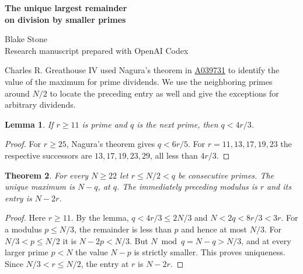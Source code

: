 \documentclass[11pt,letterpaper]{article}
\newtheorem{theorem}{Theorem}
\newtheorem{lemma}[theorem]{Lemma}
\newcommand{\oeis}[1]{\href{https://oeis.org/A#1}{A#1}}
\begin{document}
\thispagestyle{plain}
\begin{center}
{\LARGE\bfseries The unique largest remainder\\[0.12em] on division by smaller primes\par}
\vspace{0.5em}
Blake Stone\\
{\small Research manuscript prepared with OpenAI Codex}
\end{center}

\begin{abstract}
For an integer $N\ge3$, list $N\bmod p$ over the primes $p<N$ in increasing order. The largest entry is always unique. Its modulus is the first prime above $N/2$, with the single exception $N=14$. For $N\ge4$ the entry preceding the maximum has the parity of $N$, except at $N=9,21$. Restricting to prime $N$ proves Mike Jones's conjecture on OEIS \oeis{207409}.
\end{abstract}

Charles R. Greathouse IV used Nagura's theorem in \oeis{039731} to identify the value of the maximum for prime dividends. We use the neighboring primes around $N/2$ to locate the preceding entry as well and give the exceptions for arbitrary dividends.

\begin{lemma}
If $r\ge11$ is prime and $q$ is the next prime, then $q<4r/3$.
\end{lemma}
\begin{proof}
For $r\ge25$, Nagura's theorem \cite{nagura} gives $q<6r/5$. For $r=11,13,17,19,23$ the respective successors are $13,17,19,23,29$, all less than $4r/3$.
\end{proof}

\begin{theorem}
For every $N\ge22$ let $r\le N/2<q$ be consecutive primes. The unique maximum is $N-q$, at $q$. The immediately preceding modulus is $r$ and its entry is $N-2r$.
\end{theorem}
\begin{proof}
Here $r\ge11$. By the lemma, $q<4r/3\le2N/3$ and $N<2q<8r/3<3r$. For a modulus $p\le N/3$, the remainder is less than $p$ and hence at most $N/3$. For $N/3<p\le N/2$ it is $N-2p<N/3$. But $N\bmod q=N-q>N/3$, and at every larger prime $p<N$ the value $N-p$ is strictly smaller. This proves uniqueness. Since $N/3<r\le N/2$, the entry at $r$ is $N-2r$.
\end{proof}
\end{document}
